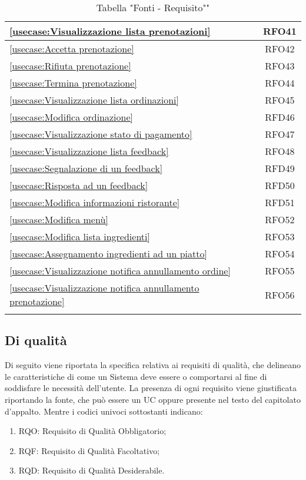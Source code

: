 \begin{longtable}{|l|c|}
    \hline
    \autoref{usecase:Visualizzazione lista prenotazioni} & RFO41 \\
    \hline
    \autoref{usecase:Accetta prenotazione} & RFO42 \\
    \hline
    \autoref{usecase:Rifiuta prenotazione} & RFO43 \\
    \hline
    \autoref{usecase:Termina prenotazione} & RFO44 \\
    \hline
    \autoref{usecase:Visualizzazione lista ordinazioni} & RFO45 \\
    \hline
    \autoref{usecase:Modifica ordinazione} & RFD46 \\
    \hline
    \autoref{usecase:Visualizzazione stato di pagamento} & RFO47 \\
    \hline
    \autoref{usecase:Visualizzazione lista feedback} & RFO48 \\
    \hline
    \autoref{usecase:Segnalazione di un feedback} & RFD49 \\
    \hline
    \autoref{usecase:Risposta ad un feedback} & RFD50 \\
    \hline
    \autoref{usecase:Modifica informazioni ristorante} & RFD51 \\
    \hline
    \autoref{usecase:Modifica menù} & RFO52 \\
    \hline
    \autoref{usecase:Modifica lista ingredienti} & RFO53 \\
    \hline
    \autoref{usecase:Assegnamento ingredienti ad un piatto} & RFO54 \\
    \hline
    \autoref{usecase:Visualizzazione notifica annullamento ordine} & RFO55 \\
    \hline
    \autoref{usecase:Visualizzazione notifica annullamento prenotazione} & RFO56 \\
    \hline
    \caption{Tabella "Fonti - Requisito""}
\end{longtable}




\subsection{Di qualità}

Di seguito viene riportata la specifica relativa ai requisiti di qualità, che delineano le caratteristiche di come un Sistema
deve essere o comportarsi al fine di soddisfare le necessità dell'utente.
La presenza di ogni requisito viene giustificata riportando la fonte, che può essere un UC oppure presente
nel testo del capitolato d'appalto. Mentre i codici univoci sottostanti indicano:
\begin{enumerate}
	\item RQO: Requisito di Qualità Obbligatorio;
	\item RQF: Requisito di Qualità Facoltativo;
	\item RQD: Requisito di Qualità Desiderabile.
\end{enumerate}

